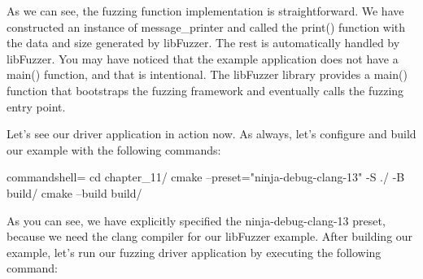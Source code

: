 As we can see, the fuzzing function implementation is straightforward. We have constructed an instance of message\_printer and called the print() function with the data and size generated by libFuzzer. The rest is automatically handled by libFuzzer. You may have noticed that the example application does not have a main() function, and that is intentional. The libFuzzer library provides a main() function that bootstraps the fuzzing framework and eventually calls the fuzzing entry point.

Let's see our driver application in action now. As always, let's configure and build our example with the following commands:

\begin{tcblisting}{commandshell={}}
cd chapter_11/
cmake --preset="ninja-debug-clang-13" -S ./ -B build/
cmake --build build/
\end{tcblisting}

As you can see, we have explicitly specified the ninja-debug-clang-13 preset, because we need the clang compiler for our libFuzzer example. After building our example, let's run our fuzzing driver application by executing the following command:

